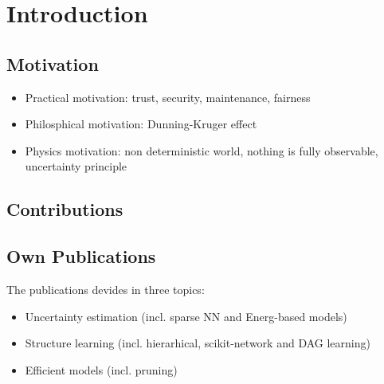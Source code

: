 \chapter{Introduction}
\label{chap:introduction}

\section{Motivation}

\begin{itemize}
\item Practical motivation: trust, security, maintenance, fairness
\item Philosphical motivation: Dunning-Kruger effect
\item Physics motivation: non deterministic world, nothing is fully observable, uncertainty principle
\end{itemize}

\section{Contributions}

\section{Own Publications}

The publications devides in three topics:
\begin{itemize}
\item Uncertainty estimation (incl. sparse NN and Energ-based models)
\item Structure learning (incl. hierarhical, scikit-network and DAG learning)
\item Efficient models (incl. pruning)
\end{itemize}